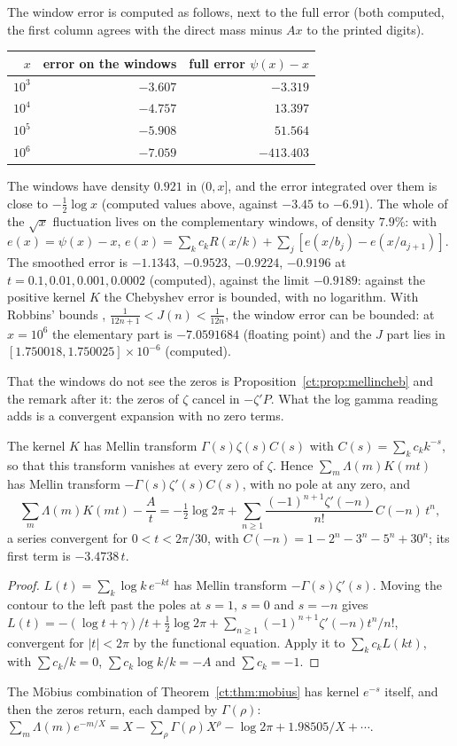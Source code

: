 The window error is computed as follows, next to the full error (both computed, the first column agrees with the direct mass minus $Ax$ to the printed digits).
\begin{center}
\small
\begin{tabular}{rrr}
\toprule
$x$ & error on the windows & full error $\psi(x)-x$\\
\midrule
$10^3$ & $-3.607$ & $-3.319$\\
$10^4$ & $-4.757$ & $13.397$\\
$10^5$ & $-5.908$ & $51.564$\\
$10^6$ & $-7.059$ & $-413.403$\\
\bottomrule
\end{tabular}
\end{center}
The windows have density $0.921$ in $(0,x]$, and the error integrated over them is close to $-\frac12\log x$ (computed values above, against $-3.45$ to $-6.91$). The whole of the $\sqrt x$ fluctuation lives on the complementary windows, of density $7.9\%$: with $e(x)=\psi(x)-x$, $e(x)=\sum_kc_kR(x/k)+\sum_j[e(x/b_j)-e(x/a_{j+1})]$. The smoothed error is $-1.1343$, $-0.9523$, $-0.9224$, $-0.9196$ at $t=0.1,0.01,0.001,0.0002$ (computed), against the limit $-0.9189$: against the positive kernel $K$ the Chebyshev error is bounded, with no logarithm. With Robbins' bounds \cite{Robbins55}, $\frac1{12n+1}<J(n)<\frac1{12n}$, the window error can be bounded: at $x=10^6$ the elementary part is $-7.0591684$ (floating point) and the $J$ part lies in $[1.750018,1.750025]\times10^{-6}$ (computed).

That the windows do not see the zeros is Proposition~\ref{ct:prop:mellincheb} and the remark after it: the zeros of $\zeta$ cancel in $-\zeta'P$. What the log gamma reading adds is a convergent expansion with no zero terms.
\begin{proposition}\label{lg:prop:blind}
The kernel $K$ has Mellin transform $\Gamma(s)\zeta(s)C(s)$ with $C(s)=\sum_kc_kk^{-s}$, so that this transform vanishes at every zero of $\zeta$. Hence $\sum_m\Lambda(m)K(mt)$ has Mellin transform $-\Gamma(s)\zeta'(s)C(s)$, with no pole at any zero, and
\[
\sum_m\Lambda(m)K(mt)-\frac At=-\tfrac12\log2\pi+\sum_{n\ge1}\frac{(-1)^{n+1}\zeta'(-n)}{n!}\,C(-n)\,t^n ,
\]
a series convergent for $0<t<2\pi/30$, with $C(-n)=1-2^n-3^n-5^n+30^n$; its first term is $-3.4738\,t$.
\end{proposition}
\begin{proof}
$L(t)=\sum_k\log k\,e^{-kt}$ has Mellin transform $-\Gamma(s)\zeta'(s)$. Moving the contour to the left past the poles at $s=1$, $s=0$ and $s=-n$ gives $L(t)=-(\log t+\gamma)/t+\frac12\log2\pi+\sum_{n\ge1}(-1)^{n+1}\zeta'(-n)t^n/n!$, convergent for $|t|<2\pi$ by the functional equation. Apply it to $\sum_kc_kL(kt)$, with $\sum c_k/k=0$, $\sum c_k\log k/k=-A$ and $\sum c_k=-1$.
\end{proof}
The Möbius combination of Theorem~\ref{ct:thm:mobius} has kernel $e^{-s}$ itself, and then the zeros return, each damped by $\Gamma(\rho)$: $\sum_m\Lambda(m)e^{-m/X}=X-\sum_\rho\Gamma(\rho)X^\rho-\log2\pi+1.98505/X+\cdots$.
